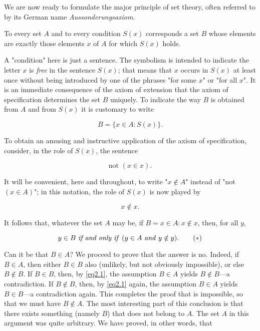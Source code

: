 We are now ready to formulate the major principle of set theory, often referred to by its German name \textit{Aussonderungsaxiom}. 

\begin{named} To every set $A$ and to every condition $S(x)$ corresponds a set $B$ whose elements are exactly those elements $x$ of $A$ for which $S(x)$ holds.
\end{named}

A "condition" here is just a sentence. The symbolism is intended to indicate the letter $x$ is \textit{free} in the sentence $S(x)$; that means that $x$ occurs in $S(x)$ at least once without being introduced by one of the phrases "for some $x$" or "for all $x$". It is an immediate consequence of the axiom of extension that the axiom of specification determines the set $B$ uniquely. To indicate the way $B$ is obtained from $A$ and from $S(x)$ it is customary to write 

\begin{equation*}
B  = \{ x \in A: S(x) \}. 
\end{equation*}

To obtain an amusing and instructive application of the axiom of specification, consider, in the role of $S(x)$, the sentence

\begin{equation*}
\text{not } (x \in x).
\end{equation*}

It will be convenient, here and throughout, to write "$x \notin  A$" instead of "not $(x \in A)$"; in this notation, the role of $S(x)$ is now played by

\begin{equation*}
x \notin x.
\end{equation*}

It follows that, whatever the set $A$ may be, if $B = {x \in A: x \notin x}$, then, for all $y$,

\begin{equation}
\label{eq2.1}
y \in B \text{ \textit{if and only if }} ( y \in A \text{ \textit{and} } y \notin y). \tag{$\ast$}
\end{equation}

Can it be that $B \in A$? We proceed to prove that the answer is no. Indeed, if $B \in A$, then either $B \in B$ also (unlikely, but not obviously impossible), or else $B \notin B$. If $B \in B$, then, by \eqref{eq2.1}, the assumption $B \in A$ yields $B \notin B$—a contradiction. If $B \notin B$, then, by \eqref{eq2.1} again, the assumption $B \in A$ yields $B \in B$—a contradiction again. This completes the proof that is impossible, so that we must have $B \notin A$. The most interesting part of this conclusion is that there exists something (namely $B$) that does not belong to $A$. The set $A$ in this argument was quite arbitrary. We have proved, in other words, that 

